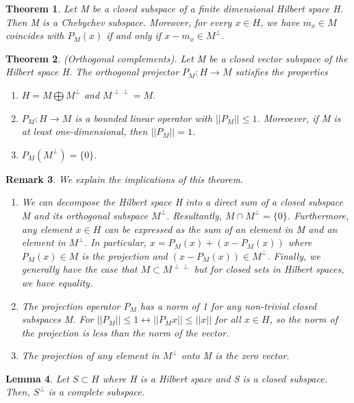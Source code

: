 \documentclass[twoside]{article}
\newcounter{lecnum}
\newtheorem{theorem}{Theorem}[lecnum]
\newtheorem{lemma}[theorem]{Lemma}
\newtheorem{remark}[theorem]{Remark}
\begin{document}
\begin{theorem}Let M be a closed subspace of a finite dimensional Hilbert space H. Then M is a Chebychev subspace. Moreover, for every $x \in H$, we have $m_x \in M$ coincides with $P_M(x)$ if and only if $x - m_x \in M^{\perp}$. 
\end{theorem}


\begin{theorem}(Orthogonal complements). Let M be a closed vector subspace of the Hilbert space H. The orthogonal projector $P_M: H \rightarrow M$ satisfies the properties 
\begin{enumerate}
\item $H = M \bigoplus M^{\perp}$ and $M^{\perp \perp} = M$.
\item $P_M:H \rightarrow M$ is a bounded linear operator with $||P_M|| \leq 1$. Moreoever, if M is at least one-dimensional, then $||P_M|| = 1$.
\item $P_M(M^{\perp}) = \{0\}$.
\end{enumerate}
\end{theorem}

\begin{remark}We explain the implications of this theorem.
\begin{enumerate}
\item We can decompose the Hilbert space H into a direct sum of a closed subspace M and its orthogonal subspace $M^{\perp}$. Resultantly, $M \cap M^{\perp} = \{0\}$. Furthermore, any element $x \in H$ can be expressed as the sum of an element in M and an element in $M^{\perp}$. In particular, $x = P_M(x) + (x - P_M(x))$ where $P_M(x) \in M$ is the projection and $(x - P_M(x)) \in M^{\perp}$. Finally, we generally have the case that $M \subset M^{\perp \perp}$ but for closed sets in Hilbert spaces, we have equality.
\item The projection operator $P_M$ has a norm of 1 for any non-trivial closed subspaces M. For $||P_M|| \leq 1 \leftrightarrow ||P_Mx|| \leq ||x||$ for all $x \in H$, so the norm of the projection is less than the norm of the vector.
\item The projection of any element in $M^{\perp}$ onto M is the zero vector.
\end{enumerate}
\end{remark}

\begin{lemma}Let $S \subset H$ where H is a Hilbert space and S is a closed subspace. Then, $S^{\perp}$ is a complete subspace.
\end{lemma}
\end{document}
